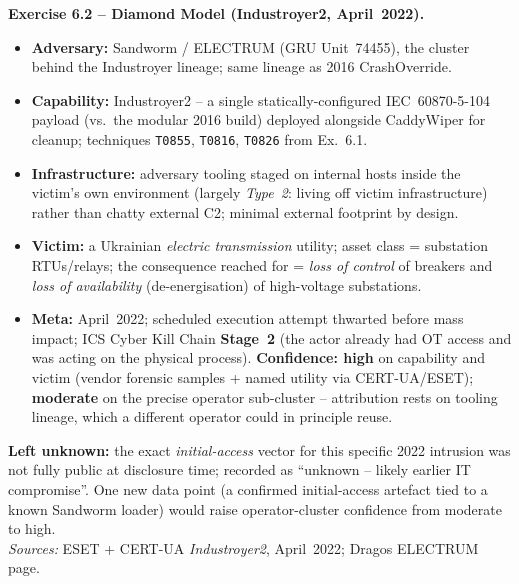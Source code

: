 \documentclass[11pt,a4paper]{article}
\begin{document}
\begin{solutionbox}
\textbf{Exercise 6.2 -- Diamond Model (Industroyer2, April~2022).}
\begin{itemize}\setlength{\itemsep}{1pt}
  \item \textbf{Adversary:} Sandworm / ELECTRUM (GRU Unit~74455), the cluster behind the
        Industroyer lineage; same lineage as 2016 CrashOverride.
  \item \textbf{Capability:} Industroyer2 -- a single statically-configured IEC~60870-5-104
        payload (vs.\ the modular 2016 build) deployed alongside CaddyWiper for cleanup;
        techniques \texttt{T0855}, \texttt{T0816}, \texttt{T0826} from Ex.~6.1.
  \item \textbf{Infrastructure:} adversary tooling staged on internal hosts inside the
        victim's own environment (largely \emph{Type~2}: living off victim infrastructure)
        rather than chatty external C2; minimal external footprint by design.
  \item \textbf{Victim:} a Ukrainian \emph{electric transmission} utility; asset class =
        substation RTUs/relays; the consequence reached for = \emph{loss of control} of
        breakers and \emph{loss of availability} (de-energisation) of high-voltage substations.
  \item \textbf{Meta:} April~2022; scheduled execution attempt thwarted before mass impact;
        ICS Cyber Kill Chain \textbf{Stage~2} (the actor already had OT access and was acting on
        the physical process). \textbf{Confidence: high} on capability and victim (vendor
        forensic samples + named utility via CERT-UA/ESET); \textbf{moderate} on the precise
        operator sub-cluster -- attribution rests on tooling lineage, which a different
        operator could in principle reuse.
\end{itemize}
\textbf{Left unknown:} the exact \emph{initial-access} vector for this specific 2022 intrusion
was not fully public at disclosure time; recorded as ``unknown -- likely earlier IT
compromise''. One new data point (a confirmed initial-access artefact tied to a known Sandworm
loader) would raise operator-cluster confidence from moderate to high.\\[2pt]
\emph{Sources:} ESET + CERT-UA \emph{Industroyer2}, April~2022; Dragos ELECTRUM page.
\end{solutionbox}
\end{document}
